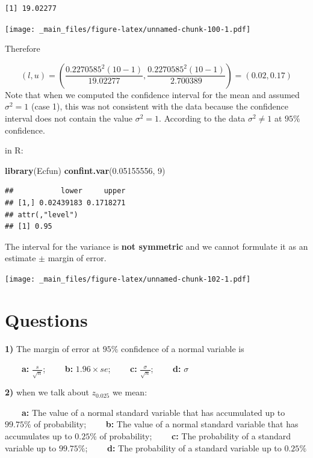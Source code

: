\documentclass[
]{book}
\newenvironment{Shaded}{\begin{snugshade}}{\end{snugshade}}
\newcommand{\DecValTok}[1]{\textcolor[rgb]{0.00,0.00,0.81}{#1}}
\newcommand{\FloatTok}[1]{\textcolor[rgb]{0.00,0.00,0.81}{#1}}
\newcommand{\FunctionTok}[1]{\textcolor[rgb]{0.13,0.29,0.53}{\textbf{#1}}}
\newcommand{\NormalTok}[1]{#1}
\begin{document}
\begin{verbatim}
[1] 19.02277
\end{verbatim}

\texttt{[image: \_main\_files/figure-latex/unnamed-chunk-100-1.pdf]}

Therefore

\[(l,u)= (\frac{0.2270585^2 (10-1)}{19.02277},\frac{0.2270585^2(10-1)}{2.700389})=(0.02,0.17)\]
Note that when we computed the confidence interval for the mean and assumed \(\sigma^2=1\) (case 1), this was not consistent with the data because the confidence interval does not contain the value \(\sigma^2=1\).
According to the data \(\sigma^2 \neq 1\) at \(95\%\) confidence.

in R:

\begin{Shaded}
\begin{Highlighting}[]
\FunctionTok{library}\NormalTok{(Ecfun)}
\FunctionTok{confint.var}\NormalTok{(}\FloatTok{0.05155556}\NormalTok{, }\DecValTok{9}\NormalTok{)}
\end{Highlighting}
\end{Shaded}

\begin{verbatim}
##           lower     upper
## [1,] 0.02439183 0.1718271
## attr(,"level")
## [1] 0.95
\end{verbatim}

The interval for the variance is \textbf{not symmetric} and we cannot formulate it as an estimate \(\pm\) margin of error.

\texttt{[image: \_main\_files/figure-latex/unnamed-chunk-102-1.pdf]}

\hypertarget{questions-10}{%
\section{Questions}\label{questions-10}}

\textbf{1)} The margin of error at \(95\%\) confidence of a normal variable is

\textbf{\(\qquad\)a:} \(\frac{s}{\sqrt{n}}\);
\textbf{\(\qquad\)b:} \(1.96\times se\);
\textbf{\(\qquad\)c:} \(\frac{\sigma}{\sqrt{n}}\);
\textbf{\(\qquad\)d:} \(\sigma\)

\textbf{2)} when we talk about \(z_{0.025}\) we mean:

\textbf{\(\qquad\)a:} The value of a normal standard variable that has accumulated up to \(99.75\%\) of probability;
\textbf{\(\qquad\)b:} The value of a normal standard variable that has accumulates up to \(0.25\%\) of probability;
\textbf{\(\qquad\)c:} The probability of a standard variable up to \(99.75\%\);
\textbf{\(\qquad\)d:} The probability of a standard variable up to \(0.25\%\)
\end{document}
